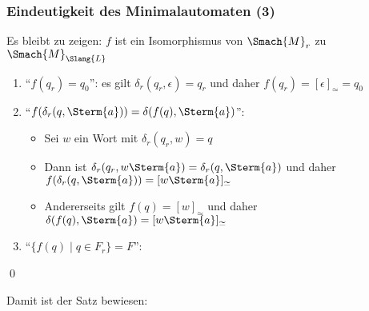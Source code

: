\documentclass[aspectratio=1610,onlymath]{beamer}
\begin{document}
\begin{frame}[t]\frametitle{Eindeutigkeit des Minimalautomaten (3)}

Es bleibt zu zeigen: $f$ ist ein Isomorphismus von $\Smach{M}_r$ zu $\Smach{M}_{\Slang{L}}$\pause

\begin{enumerate}[(1)]
\item "`$f(q_r)=q_0$"': \pause es gilt $\delta_r(q_r,\epsilon)=q_r$ und daher $f(q_r)=[\epsilon]_\simeq=q_0$ \pause
\item "`$f(\delta_r(q,\Sterm{a})) = \delta(f(q),\Sterm{a})$"': \pause
	\begin{itemize}
	\item Sei $w$ ein Wort mit $\delta_r(q_r,w)=q$\pause
	\item Dann ist $\delta_r(q_r,w\Sterm{a})=\delta_r(q,\Sterm{a})$ und daher $f(\delta_r(q,\Sterm{a}))=[w\Sterm{a}]_\simeq$\pause
	\item Andererseits gilt $f(q)=[w]_\simeq$ und daher $\delta(f(q),\Sterm{a})=[w\Sterm{a}]_\simeq$
	\end{itemize}\pause
\item "`$\{f(q)\mid q\in F_r\}=F$"': \pause
\end{enumerate}
\pause

\qed
\bigskip

Damit ist der Satz bewiesen:\smallskip


\end{frame}
\end{document}
